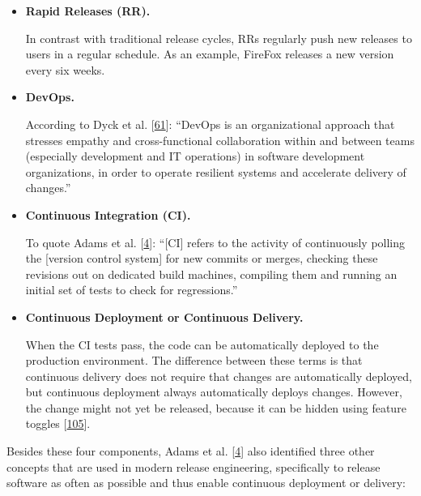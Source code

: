 \documentclass[]{book}
\begin{document}
\begin{itemize}
\item
  \textbf{Rapid Releases (RR).}

  In contrast with traditional release cycles, RRs regularly push new
  releases to users in a regular schedule. As an example, FireFox
  releases a new version every six weeks.
\item
  \textbf{DevOps.}

  According to Dyck et al. {[}\protect\hyperlink{ref-dyck2015a}{61}{]}:
  ``DevOps is an organizational approach that stresses empathy and
  cross-functional collaboration within and between teams (especially
  development and IT operations) in software development organizations,
  in order to operate resilient systems and accelerate delivery of
  changes.''
\item
  \textbf{Continuous Integration (CI).}

  To quote Adams et al. {[}\protect\hyperlink{ref-adams2016a}{4}{]}:
  ``{[}CI{]} refers to the activity of continuously polling the
  {[}version control system{]} for new commits or merges, checking these
  revisions out on dedicated build machines, compiling them and running
  an initial set of tests to check for regressions.''
\item
  \textbf{Continuous Deployment or Continuous Delivery.}

  When the CI tests pass, the code can be automatically deployed to the
  production environment. The difference between these terms is that
  continuous delivery does not require that changes are automatically
  deployed, but continuous deployment always automatically deploys
  changes. However, the change might not yet be released, because it can
  be hidden using feature toggles
  {[}\protect\hyperlink{ref-laukkanen2018a}{105}{]}.
\end{itemize}

Besides these four components, Adams et al.
{[}\protect\hyperlink{ref-adams2016a}{4}{]} also identified three other
concepts that are used in modern release engineering, specifically to
release software as often as possible and thus enable continuous
deployment or delivery:
\end{document}
